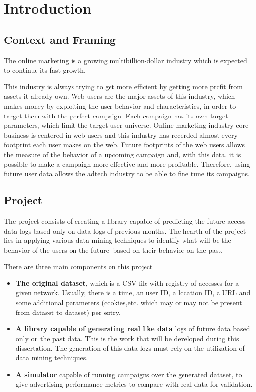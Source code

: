 \chapter{Introduction} \label{chap:intro}


\section{Context and Framing} \label{sec:context}

The online marketing is a growing multibillion-dollar industry \cite{PricewaterhouseCoopers2013}
which is expected to continue its fast growth.\cite{PricewaterhouseCoopers2013a}

This industry is always trying to get more efficient by getting more profit from assets it already own. 
Web users are the major assets of this industry, which makes money by exploiting the user behavior and characteristics, in order to target them with the
perfect campaign. Each campaign has its own target parameters, which limit the target user universe.
Online marketing industry core business is centered in web users and this industry has recorded almost every footprint each user makes on the web.
Future footprints of the web users allows the measure of the behavior of a upcoming campaign and, with this data, it is possible to make a campaign more
effective and more profitable. Therefore, using future user data allows the adtech industry to be able to fine tune its campaigns. 

\section{Project} \label{sec:proj}

The project consists of creating a library capable of predicting the future access data logs based only on data logs of previous months.
The hearth of the project lies in applying various data mining techniques to identify what will be the behavior of the users on the future,
based on their behavior on the past.

There are three main components on this project
\begin{itemize}
\item \textbf{The original dataset}, which is a CSV file with registry of accesses for a given network. Usually, there is 
  a time, an user ID, a location ID, a URL and some additional parameters (cookies,etc. which may or may not be present from dataset to dataset) per entry.
\item \textbf{A library capable of generating real like data} logs of future data based only on the past data. This is the work that will be developed during
  this dissertation. The generation of this data logs must rely on the utilization of data mining techniques.
\item \textbf{A simulator} capable of running campaigns over the generated dataset, to give advertising performance metrics to compare with real data for validation.
\end{itemize}

